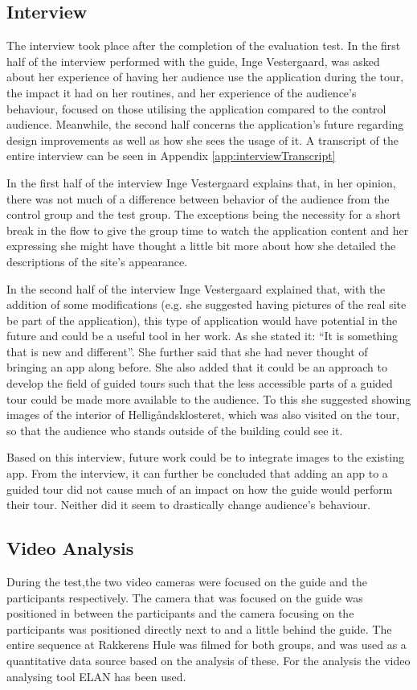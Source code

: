 \subsection{Interview}
The interview took place after the completion of the evaluation test. In the first half of the interview performed with the guide, Inge Vestergaard, was asked about her experience of having her audience use the application during the tour, the impact it had on her routines, and her experience of the audience’s behaviour, focused on those utilising the application compared to the control audience. Meanwhile, the second half concerns the application’s future regarding design improvements as well as how she sees the usage of it. A transcript of the entire interview can be seen in Appendix \ref{app:interviewTranscript}

In the first half of the interview Inge Vestergaard explains that, in her opinion, there was not much of a difference between behavior of the audience from the control group and the test group. The exceptions being the necessity for a short break in the flow to give the group time to watch the application content and her expressing she might have thought a little bit more about how she detailed the descriptions of the site’s appearance.     

In the second half of the interview Inge Vestergaard explained that, with the addition of some modifications (e.g. she suggested having pictures of the real site be part of the application), this type of application would have potential in the future and could be a useful tool in her work. As she stated it: “It is something that is new and different”. She further said that she had never thought of bringing an app along before. She also added that it could be an approach to develop the field of guided tours such that the less accessible parts of a guided tour could be made more available to the audience. To this she suggested showing images of the interior of Helligåndsklosteret, which was also visited on the tour, so that the audience who stands outside of the building could see it.

Based on this interview, future work could be to integrate images to the existing app. From the interview, it can further be concluded that adding an app to a guided tour did not cause much of an impact on how the guide would perform their tour. Neither did it seem to drastically change audience’s behaviour. 

\subsection{Video Analysis}
During the test,the two video cameras were focused on the guide and the participants respectively. The camera that was focused on the guide was positioned in between the participants and the camera focusing on the participants was positioned directly next to and a little behind the guide. The entire sequence at Rakkerens Hule was filmed for both groups, and was used as a quantitative data source based on the analysis of these. For the analysis the video analysing tool ELAN has been used. 

